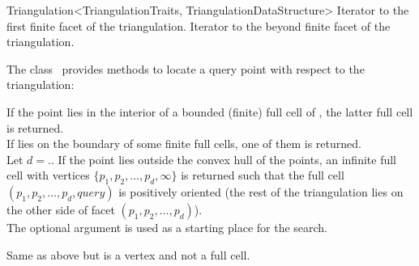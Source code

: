 \begin{ccRefClass}{Triangulation<TriangulationTraits, TriangulationDataStructure>}
{Iterator to the first finite facet of the triangulation.}
\ccGlue
{}
{Iterator to the beyond finite facet of the triangulation.}


The class \ccRefName\ provides methods to locate a query point with respect to
the triangulation:

{If the point  lies in the interior of a bounded (finite) full cell of \ccVar,
the latter full cell is returned.\\
If  lies on the boundary of some finite full cells, one of them
is returned.\\
Let $d=$\ccVar.. If the point  lies
outside the convex hull of the points, an infinite full cell with vertices $\{
p_1, p_2, \ldots, p_d, \infty\}$ is returned such that the full cell $(p_1, p_2,
\ldots, p_d, query)$ is positively oriented (the rest of the triangulation lies
on the other side of facet $(p_1, p_2, \ldots, p_d)$).\\
The optional argument  is used as a starting place for the search.}

{Same as above but  is a vertex and not a full cell.}


\end{ccRefClass}
